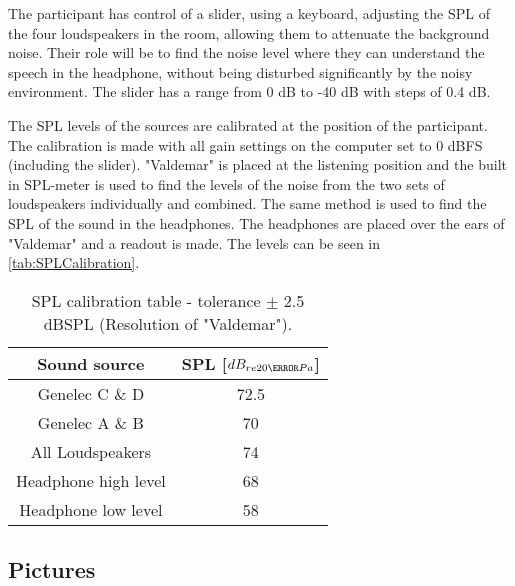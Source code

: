 The participant has control of a slider, using a keyboard, adjusting the SPL of the four loudspeakers in the room, allowing them to attenuate the background noise. Their role will be to find the noise level where they can understand the speech in the headphone, without being disturbed significantly by the noisy environment. The slider has a range from 0 dB to -40 dB with steps of 0.4 dB. 

The SPL levels of the sources are calibrated at the position of the participant. The calibration is made with all gain settings on the computer set to 0 dBFS (including the slider). "Valdemar" is placed at the listening position and the built in SPL-meter is used to find the levels of the noise from the two sets of loudspeakers individually and combined. 
The same method is used to find the SPL of the sound in the headphones. The headphones are placed over the ears of "Valdemar" and a readout is made. The levels can be seen in \autoref{tab:SPLCalibration}.

\begin{table} [H]
\centering
\label{SPLtableNA}
	\begin{tabular}{c c}											\toprule
		Sound source				& 	SPL [$dB_{re20\micro Pa}$]	\\ 	\bottomrule
		Genelec C \& D				& 	72.5					\\
		Genelec A \& B				&	70						\\
		All Loudspeakers				&	74						\\
		Headphone high level		&	68						\\ 	
		Headphone low level			&	58						\\	\bottomrule
	\end{tabular}
	\caption{SPL calibration table - tolerance $\pm$ 2.5 dBSPL (Resolution of "Valdemar").}
	\label{tab:SPLCalibration}
\end{table}   



\subsection{Pictures}

